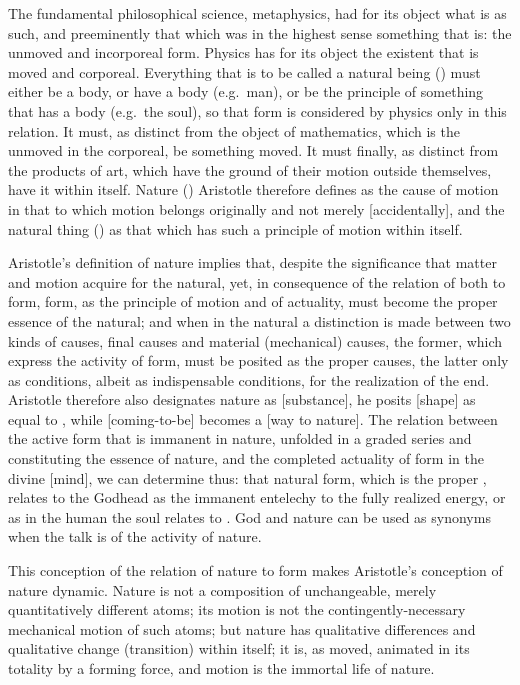 The fundamental philosophical science, metaphysics, had for its object
what is as such, and preeminently that which was in the highest sense
something that is: the unmoved and incorporeal form. Physics has for
its object the existent that is moved and corporeal. Everything that
is to be called a natural being () must either be a body, or have a
body (e.g.\ man), or be the principle of something that has a body
(e.g.\ the soul), so that form is considered by physics only in this
relation. It must, as distinct from the object of mathematics, which
is the unmoved in the corporeal, be something moved. It must finally,
as distinct from the products of art, which have the ground of their
motion outside themselves, have it within itself. Nature ()
Aristotle therefore defines as the cause of motion in that to which
motion belongs originally and not merely  [accidentally], and the
natural thing () as that which has such a principle of motion
within itself.

Aristotle's definition of nature implies that, despite the significance
that matter and motion acquire for the natural, yet, in consequence of
the relation of both to form, form, as the principle of motion and of
actuality, must become the proper essence of the natural; and when in
the natural a distinction is made between two kinds of causes, final
causes and material (mechanical) causes, the former, which express the
activity of form, must be posited as the proper causes, the latter only
as conditions, albeit as indispensable conditions, for the realization
of the end. Aristotle therefore also designates nature as 
[substance], he posits  [shape] as equal to , while 
[coming-to-be] becomes a  [way to nature]. The relation between the
active form that is immanent in nature, unfolded in a graded
series and constituting the essence of nature, and the completed
actuality of form in the divine  [mind], we can determine thus:
that natural form, which is the proper , relates to the Godhead as
the immanent entelechy to the fully realized energy, or as in the human
the soul relates to . God and nature can be used as synonyms when
the talk is of the activity of nature.

This conception of the relation of nature to form makes Aristotle's
conception of nature dynamic. Nature is not a composition of
unchangeable, merely quantitatively different atoms; its motion is not
the contingently-necessary mechanical motion of such atoms; but nature
has qualitative differences and qualitative change (transition) within
itself; it is, as moved, animated in its totality by a forming force,
and motion is the immortal life of nature.

